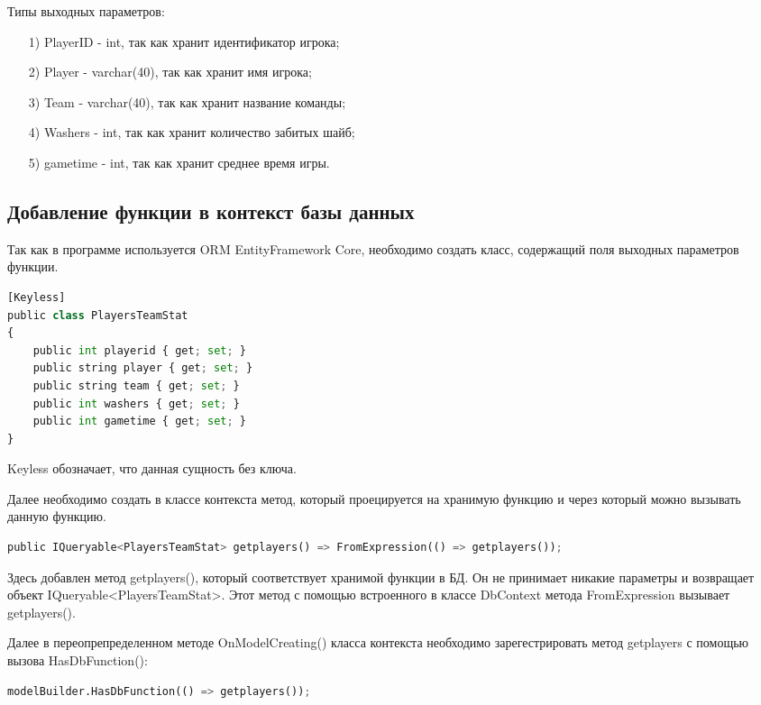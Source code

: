 Типы выходных параметров:
\begin{itemize}
	\item[1)] PlayerID - int, так как хранит идентификатор игрока;
	\item[2)] Player - varchar(40), так как хранит имя игрока;
	\item[3)] Team - varchar(40), так как хранит название команды;
	\item[4)] Washers - int, так как хранит количество забитых шайб;
	\item[5)] gametime - int, так как хранит среднее время игры.
\end{itemize}

\subsection{Добавление функции в контекст базы данных}
Так как в программе используется ORM EntityFramework Core, необходимо создать класс, содержащий поля выходных параметров функции.
\begin{lstlisting}[label={lst:table},caption=Класс PlayerTeamStat., language=python]
[Keyless]
public class PlayersTeamStat
{
	public int playerid { get; set; }
	public string player { get; set; }
	public string team { get; set; }
	public int washers { get; set; }
	public int gametime { get; set; }
}
\end{lstlisting}
Keyless обозначает, что данная сущность без ключа.

Далее необходимо создать в классе контекста метод, который проецируется на хранимую функцию и через который можно вызывать данную функцию.
\begin{lstlisting}[label={lst:method},caption=Метод getplayers., language=python]
public IQueryable<PlayersTeamStat> getplayers() => FromExpression(() => getplayers());
\end{lstlisting}
Здесь добавлен метод getplayers(), который соответствует хранимой функции в БД. Он не принимает никакие параметры и возвращает объект IQueryable<PlayersTeamStat>. Этот метод с помощью встроенного в классе DbContext метода FromExpression вызывает getplayers().

Далее в переопрепределенном методе OnModelCreating() класса контекста необходимо зарегестрировать метод getplayers с помощью вызова HasDbFunction():
\begin{lstlisting}[label={lst:registration},caption=Регистрация метода getplayers., language=python]
modelBuilder.HasDbFunction(() => getplayers());
\end{lstlisting}

